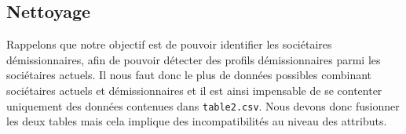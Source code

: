 \documentclass{ceri/sty/rapport}
\begin{document}
\subsection{Nettoyage}
\label{sec:Nettoyage}

Rappelons que notre objectif est de pouvoir identifier les sociétaires démissionnaires, afin de pouvoir détecter des profils démissionnaires parmi les sociétaires actuels. Il nous faut donc le plus de données possibles combinant sociétaires actuels et démissionnaires et il est ainsi impensable de se contenter uniquement des données contenues dans \texttt{table2.csv}. Nous devons donc fusionner les deux tables mais cela implique des incompatibilités au niveau des attributs.
\end{document}
